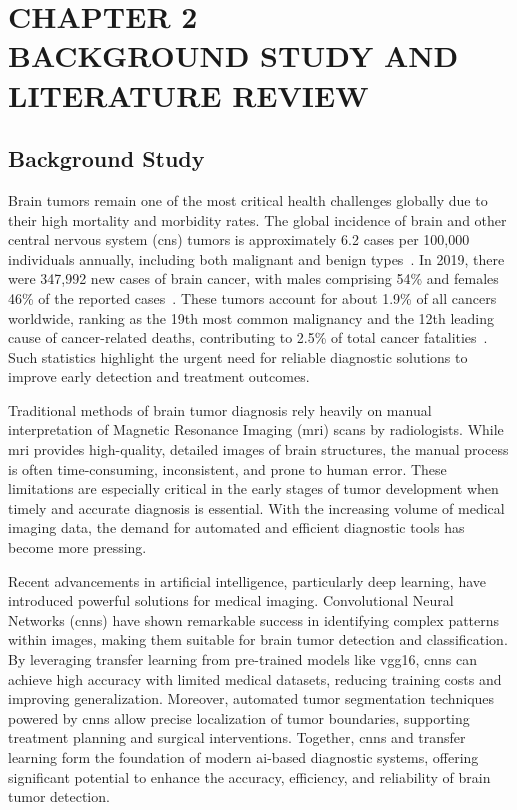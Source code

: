 \section*{\Large\centering \textbf{ CHAPTER 2 \\ BACKGROUND STUDY AND LITERATURE REVIEW }}
\setcounter{section}{2}
\setcounter{subsection}{0}

 \subsection{Background Study}
 Brain tumors remain one of the most critical health challenges globally due to their high mortality and morbidity rates. The global incidence of brain and other central nervous system (\gls{cns}) tumors is approximately 6.2 cases per 100,000 individuals annually, including both malignant and benign types~\cite{tisch2024}. In 2019, there were 347,992 new cases of brain cancer, with males comprising 54\% and females 46\% of the reported cases~\cite{ilic2023}. These tumors account for about 1.9\% of all cancers worldwide, ranking as the 19th most common malignancy and the 12th leading cause of cancer-related deaths, contributing to 2.5\% of total cancer fatalities~\cite{ilic2023}. Such statistics highlight the urgent need for reliable diagnostic solutions to improve early detection and treatment outcomes.

Traditional methods of brain tumor diagnosis rely heavily on manual interpretation of Magnetic Resonance Imaging (\gls{mri}) scans by radiologists. While \gls{mri} provides high-quality, detailed images of brain structures, the manual process is often time-consuming, inconsistent, and prone to human error. These limitations are especially critical in the early stages of tumor development when timely and accurate diagnosis is essential. With the increasing volume of medical imaging data, the demand for automated and efficient diagnostic tools has become more pressing.

Recent advancements in artificial intelligence, particularly deep learning, have introduced powerful solutions for medical imaging. Convolutional Neural Networks (\gls{cnn}s) have shown remarkable success in identifying complex patterns within images, making them suitable for brain tumor detection and classification. By leveraging transfer learning from pre-trained models like \gls{vgg16}, \gls{cnn}s can achieve high accuracy with limited medical datasets, reducing training costs and improving generalization. Moreover, automated tumor segmentation techniques powered by \gls{cnn}s allow precise localization of tumor boundaries, supporting treatment planning and surgical interventions. Together, \gls{cnn}s and transfer learning form the foundation of modern \gls{ai}-based diagnostic systems, offering significant potential to enhance the accuracy, efficiency, and reliability of brain tumor detection.

